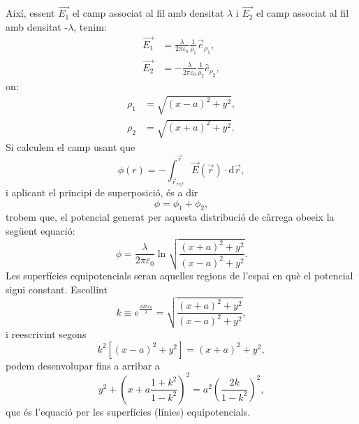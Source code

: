 \documentclass[a4paper,10.5pt]{report}
\begin{document}
\begin{appendices}
Així, essent $\vec{E_1}$ el camp associat al fil amb densitat $\lambda$ i $\vec{E_2}$ el camp associat al fil amb densitat -$\lambda$, tenim:
\begin{align}
	\vec{E_1} & = \frac{\lambda}{2\pi \varepsilon_0} \frac{1}{\rho_1} \vec{e}_{\rho_1}, \\
	\vec{E_2} & = -\frac{\lambda}{2\pi \varepsilon_0} \frac{1}{\rho_2} \hat{e}_{\rho_2},
\end{align}
on:
\begin{align}
	\rho_1 & = \sqrt{(x-a)^2+y^2}, \\
	\rho_2 & = \sqrt{(x+a)^2+y^2}. 
\end{align}
Si calculem el camp usant que
\begin{equation}
	\phi(r) = -\int_{\vec{r}_{ref}}^{\vec{r}}\vec{E}(\vec{r})\cdot \mathrm{d}\vec{r} ,
\end{equation}
i aplicant el principi de superposició, és a dir
\begin{equation}
	\phi = \phi_1+\phi_2,
\end{equation}
trobem que, el potencial generat per aquesta distribució de càrrega obeeix la següent equació:
\begin{equation}
	\phi = \frac{\lambda}{2\pi \varepsilon_0}\ln\sqrt{\frac{(x+a)^2+y^2}{(x-a)^2+y^2}}.
\end{equation}
Les superfícies equipotencials seran aquelles regions de l'espai en què el potencial sigui constant. Escollint
\begin{equation}
	k \equiv e^{\frac{\phi2\pi\varepsilon_0}{\lambda}} = \sqrt{\frac{(x+a)^2+y^2}{(x-a)^2+y^2}},
\end{equation}
i reescrivint segons
\begin{equation}
	k^2[(x-a)^2+y^2]=(x+a)^2+y^2,
\end{equation}  
podem desenvolupar fins a arribar a
\begin{equation}
	\boxed{y^2+\left( x+a\frac{1+k^2}{1-k^2}\right)^2 = a^2\left( \frac{2k}{1-k^2}\right)^2},
\end{equation}
que és l'equació per les superfícies (línies) equipotencials.

\newpage

\end{appendices}
\end{document}
